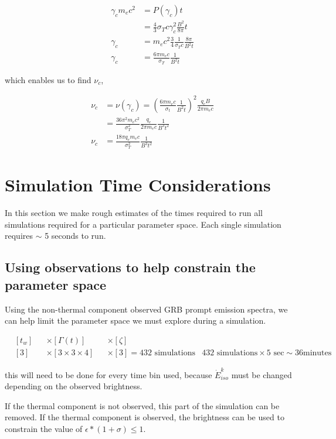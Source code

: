 \documentclass[linenumbers,twocolumn]{aastex631}
\begin{document}
\begin{appendix}
\begin{align}
	\gamma_c m_e c^2 &= P(\gamma_c) t\\
	&= \frac{4}{3} \sigma_T	c \gamma_c^2 \frac{B^2}{8\pi} t\\
	\gamma_c &= m_e c^2 \frac{3}{4} \frac{1}{\sigma_T c} \frac{8\pi}{B^2t}\\
	\gamma_c &= \frac{6 \pi m_e c}{\sigma_T} \frac{1}{B^2t}
\end{align}

which enables us to find $\nu_c$,

\begin{align}
	\nu_c &= \nu(\gamma_c) = \left(\frac{6\pi m_e c}{\sigma_t} \frac{1}{B^2t}\right)^2 \frac{q_e B}{2\pi m_e c}\\
	&= \frac{36\pi^2 m_e c^2}{\sigma_T^2} \frac{q_e}{2\pi m_e c}\frac{1}{B^3t^2}\\
	\nu_c &= \frac{18\pi q_e m_e c}{\sigma_T^2} \frac{1}{B^3t^2}
\end{align}


\section{Simulation Time Considerations}

In this section we make rough estimates of the times required to run all simulations required for a particular parameter space. Each single simulation requires $\sim$ 5 seconds to run.

\subsection{Using observations to help constrain the parameter space}

Using the non-thermal component observed GRB prompt emission spectra, we can help limit the parameter space we must explore during a simulation. 

\begin{align}
	& [t_w] &&\times [\Gamma(t)] &&\times [\zeta]  \\
	& [3] &&\times [3\times3\times4] &&\times [3] = 432 \text{ simulations}
	& 432 \text{ simulations} \times 5 \text{ sec} \sim 36 \text{minutes}
\end{align}

this will need to be done for every time bin used, because $\dot{E}^k_{iso}$ must be changed depending on the observed brightness.

If the thermal component is not observed, this part of the simulation can be removed. If the thermal component is observed, the brightness can be used to constrain the value of $\epsilon*(1+\sigma)\leq1$.


\end{appendix}
\end{document}
